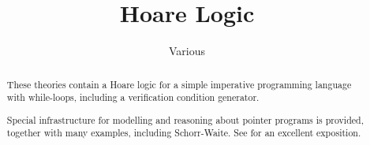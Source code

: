 \documentclass[11pt,a4paper]{report}
\begin{document}
\title{Hoare Logic}
\author{Various}
\maketitle

\begin{abstract}
These theories contain a Hoare logic for a simple imperative
programming language with while-loops, including a verification
condition generator.

Special infrastructure for modelling and reasoning about pointer
programs is provided, together with many examples, including Schorr-Waite.
See \cite{MehtaN-CADE03,MehtaN-IC05} for an excellent exposition.
\end{abstract}

\pagestyle{plain}
\thispagestyle{empty}
\tableofcontents

\newpage





\end{document}
